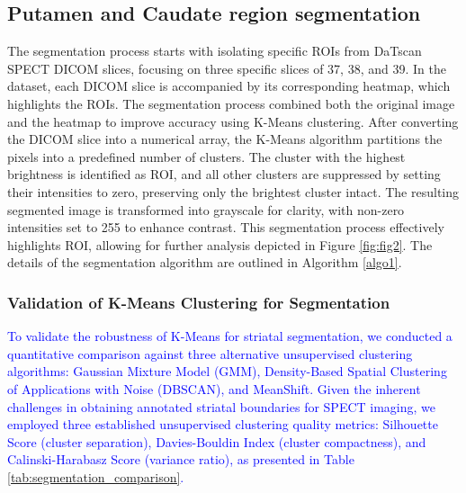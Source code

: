 \documentclass[twocolumn]{article}
\begin{document}
\subsection{Putamen and Caudate region segmentation}
The segmentation process starts with isolating specific ROIs from DaTscan SPECT DICOM slices, focusing on three specific slices of 37, 38, and 39. In the dataset, each DICOM slice is accompanied by its corresponding heatmap, which highlights the ROIs. The segmentation process combined both the original image and the heatmap to improve accuracy using K-Means clustering. After converting the DICOM slice into a numerical array, the K-Means algorithm partitions the pixels into a predefined number of clusters. The cluster with the highest brightness is identified as ROI, and all other clusters are suppressed by setting their intensities to zero, preserving only the brightest cluster intact. The resulting segmented image is transformed into grayscale for clarity, with non-zero intensities set to 255 to enhance contrast. This segmentation process effectively highlights ROI, allowing for further analysis depicted in Figure \ref{fig:fig2}. The details of the segmentation algorithm are outlined in Algorithm \ref{algo1}.

\subsubsection{Validation of K-Means Clustering for Segmentation}
\textcolor{blue}{
To validate the robustness of K-Means for striatal segmentation, we conducted a quantitative comparison against three alternative unsupervised clustering algorithms: Gaussian Mixture Model (GMM), Density-Based Spatial Clustering of Applications with Noise (DBSCAN), and MeanShift. Given the inherent challenges in obtaining annotated striatal boundaries for SPECT imaging, we employed three established unsupervised clustering quality metrics: Silhouette Score (cluster separation), Davies-Bouldin Index (cluster compactness), and Calinski-Harabasz Score (variance ratio), as presented in Table \ref{tab:segmentation_comparison}.
}
\end{document}
